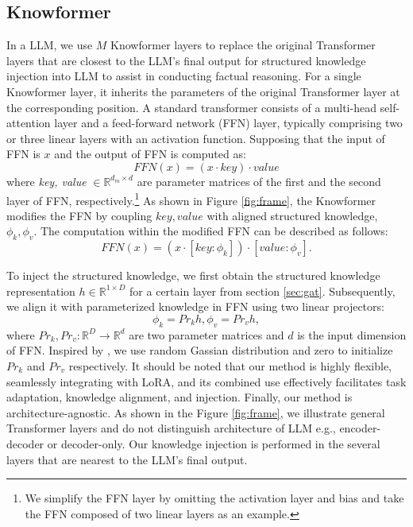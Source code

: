 \documentclass[11pt]{article}
\begin{document}
\subsection{Knowformer}
\label{sec:inject}
In a LLM, we use $M$ Knowformer layers to replace the original Transformer layers that are closest to the LLM’s final output for structured knowledge injection into LLM to assist in conducting factual reasoning. 
For a single Knowformer layer, it inherits the parameters of the original Transformer layer at the corresponding position. 
A standard transformer consists of a multi-head self-attention layer and a feed-forward network (FFN) layer, typically comprising two or three linear layers with an activation function. 
Supposing that the input of FFN is $x$ and the output of FFN is computed as:
\begin{equation}
    FFN(x)=(x \cdot key )\cdot value
\end{equation}
where \textit{key, value} $\in \mathbb{R}^{d_m \times d}$ are parameter matrices of the first and the second layer of FFN, respectively.\footnote{We simplify  the FFN layer by omitting the activation layer and bias and take the FFN composed of two linear layers as an example.}
As shown in Figure \ref{fig:frame}, the Knowformer modifies the FFN by coupling $key, value$ with aligned structured knowledge, $\phi_k,\phi_v$. 
The computation within the modified FFN can be described as follows:
\begin{equation}
FFN(x)=(x \cdot [key:\phi_k]) \cdot [value:\phi_v].
\end{equation}

To inject the structured knowledge, we first obtain the structured knowledge representation $h \in \mathbb{R}^{1\times D}$ for a certain layer from section \ref{sec:gat}.
Subsequently, we align it with parameterized knowledge in FFN using two linear projectors: 
\begin{equation}
\phi_{k}=Pr_k h, \phi_{v}=Pr_v h,
\end{equation}
where $Pr_k, Pr_v: \mathbb{R}^{D} \rightarrow \mathbb{R}^{d}$ are two parameter matrices and $d$ is the input dimension of FFN. 
Inspired by \citealt{lora}, we use random Gassian distribution and zero to initialize $Pr_k$ and $Pr_v$ respectively.
It should be noted that our method is highly flexible, seamlessly integrating with LoRA, and its combined use effectively facilitates task adaptation, knowledge alignment, and injection. 
Finally, our method is architecture-agnostic. As shown in the Figure \ref{fig:frame}, we illustrate general Transformer layers and do not distinguish architecture of LLM e.g., encoder-decoder or decoder-only. Our knowledge injection is performed in the several layers that are nearest to the LLM’s final output.
\end{document}
